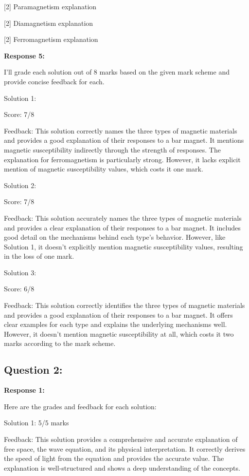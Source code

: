 \documentclass[a4paper,11pt]{article}
\begin{document}
[2] Paramagnetism explanation

[2] Diamagnetism explanation

[2] Ferromagnetism explanation

\bigskip
\textbf{Response 5:}

I'll grade each solution out of 8 marks based on the given mark scheme and provide concise feedback for each.

Solution 1:

Score: 7/8

Feedback: This solution correctly names the three types of magnetic materials and provides a good explanation of their responses to a bar magnet. It mentions magnetic susceptibility indirectly through the strength of responses. The explanation for ferromagnetism is particularly strong. However, it lacks explicit mention of magnetic susceptibility values, which costs it one mark.

Solution 2:

Score: 7/8

Feedback: This solution accurately names the three types of magnetic materials and provides a clear explanation of their responses to a bar magnet. It includes good detail on the mechanisms behind each type's behavior. However, like Solution 1, it doesn't explicitly mention magnetic susceptibility values, resulting in the loss of one mark.

Solution 3:

Score: 6/8

Feedback: This solution correctly identifies the three types of magnetic materials and provides a good explanation of their responses to a bar magnet. It offers clear examples for each type and explains the underlying mechanisms well. However, it doesn't mention magnetic susceptibility at all, which costs it two marks according to the mark scheme.

\subsection*{Question 2:}

\textbf{Response 1:}

Here are the grades and feedback for each solution:

Solution 1: 5/5 marks

Feedback: This solution provides a comprehensive and accurate explanation of free space, the wave equation, and its physical interpretation. It correctly derives the speed of light from the equation and provides the accurate value. The explanation is well-structured and shows a deep understanding of the concepts.
\end{document}
